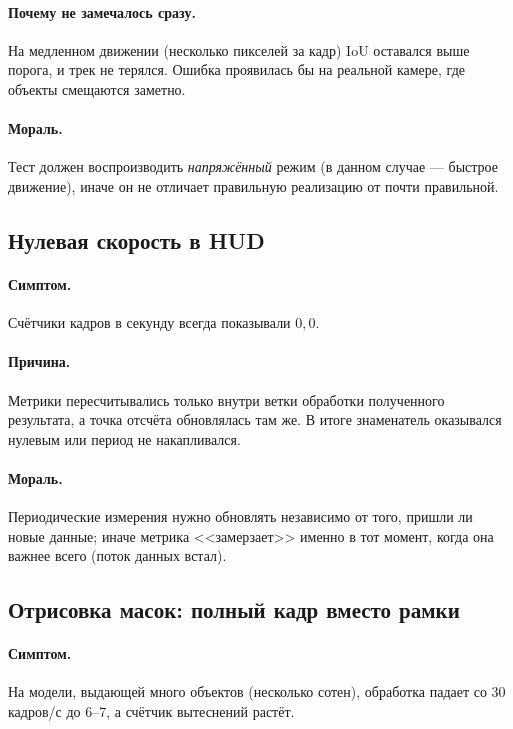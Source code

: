 \documentclass[11pt,a4paper]{article}
\theoremstyle{definition}
\theoremstyle{remark}
\begin{document}
\paragraph{Почему не замечалось сразу.} На медленном движении (несколько
пикселей за кадр) IoU оставался выше порога, и трек не терялся. Ошибка
проявилась бы на реальной камере, где объекты смещаются заметно.

\paragraph{Мораль.} Тест должен воспроизводить \emph{напряжённый} режим
(в данном случае --- быстрое движение), иначе он не отличает правильную
реализацию от почти правильной.

\subsection{Нулевая скорость в HUD}

\paragraph{Симптом.} Счётчики кадров в секунду всегда показывали $0{,}0$.

\paragraph{Причина.} Метрики пересчитывались только внутри ветки обработки
полученного результата, а точка отсчёта обновлялась там же. В итоге знаменатель
оказывался нулевым или период не накапливался.

\paragraph{Мораль.} Периодические измерения нужно обновлять независимо от
того, пришли ли новые данные; иначе метрика <<замерзает>> именно в тот
момент, когда она важнее всего (поток данных встал).

\subsection{Отрисовка масок: полный кадр вместо рамки}

\paragraph{Симптом.} На модели, выдающей много объектов (несколько сотен),
обработка падает со 30 кадров/с до 6--7, а счётчик вытеснений растёт.
\end{document}
